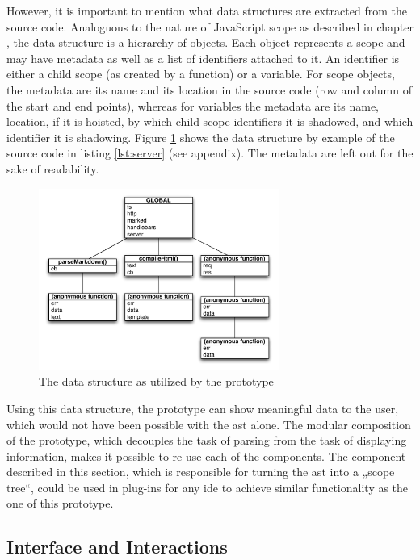 However, it is important to mention what data structures are extracted
from the source code. Analoguous to the nature of JavaScript scope as
described in chapter , the data structure is a
hierarchy of objects. Each object represents a scope and may have
metadata as well as a list of identifiers attached to it. An identifier
is either a child scope (as created by a function) or a variable. For
scope objects, the metadata are its name and its location in the source
code (row and column of the start and end points), whereas for variables
the metadata are its name, location, if it is hoisted, by which child
scope identifiers it is shadowed, and which identifier it is shadowing.
Figure \ref{fig:scope} shows the data structure by example of the source
code in listing \ref{lst:server} (see appendix). The metadata are left
out for the sake of readability.

\begin{figure}[htbp]
\centering
\includegraphics[keepaspectratio,width=0.7\textwidth]{img/scope.pdf}
\caption{The data structure as utilized by the prototype}
\label{fig:scope}
\end{figure}

Using this data structure, the prototype can show meaningful data to the
user, which would not have been possible with the \ac{ast} alone. The
modular composition of the prototype, which decouples the task of
parsing from the task of displaying information, makes it possible to
re-use each of the components. The component described in this section,
which is responsible for turning the \ac{ast} into a „scope tree“, could
be used in plug-ins for any \ac{ide} to achieve similar functionality as
the one of this prototype.

\subsection{Interface and
Interactions}\label{interface-and-interactions}

